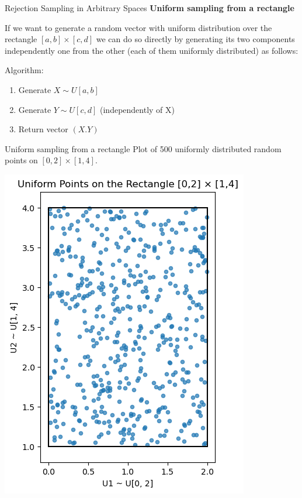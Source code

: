 \documentclass[8pt]{beamer}
\begin{document}
\begin{frame}{Rejection Sampling in Arbitrary Spaces}
\textbf{Uniform sampling from a rectangle}

\vspace{2mm}

If we want to generate a random vector with uniform distribution over the rectangle $[a,b]\times[c,d]$ we can do so directly by generating its two components independently one from the other (each of them uniformly distributed) as follows:
\vspace{2mm}

\alert{Algorithm}:

\begin{enumerate}
\item Generate $X \sim U[a,b]$
\item Generate $Y \sim U[c,d]$ (independently of X)
\item Return vector $(X.Y)$
\end{enumerate}
\end{frame}

\begin{frame}{Uniform sampling from a rectangle}
Plot of 500 uniformly distributed random points on $[0,2]\times[1,4]$.

\begin{center}
\includegraphics[scale=0.5]{chapter1-part4-plot2.png}
\end{center}
\end{frame}
\end{document}
